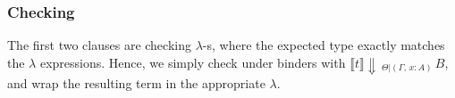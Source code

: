 \documentclass[acmsmall,review,anonymous,prologue,dvipsnames]{acmart}\settopmatter{printfolios=true,printccs=false,printacmref=false}
\newcommand{\To}{\Rightarrow}
\newcommand{\fail}{\mathsf{fail}}
\newcommand{\echeck}[4]{\llbracket#1\rrbracket\!\Downarrow\,_{#2|#3}\,#4}
\newcommand{\einfer}[4]{\llbracket#1\rrbracket\!\Uparrow\,#2\,_{#3|#4}}
\newcommand{\edo}{\boldsymbol{\mathsf{do}}}
\newcommand{\ereturn}{\boldsymbol{\mathsf{return}}}
\newcommand{\ecase}{\boldsymbol{\mathsf{case}}}
\newcommand{\eof}{\boldsymbol{\mathsf{of}}}
\newcommand{\true}{\mathsf{true}}
\newcommand{\false}{\mathsf{false}}
\newcommand{\einsert}[3]{\mathsf{insert}\,#1\,#2\,#3}
\theoremstyle{remark}
\begin{document}

\subsubsection{Checking}
The first two clauses are checking $\lambda$-s, where the expected type exactly
matches the $\lambda$ expressions. Hence, we simply check under binders with
$\echeck{t}{\Theta}{(\Gamma,\,x:A)} B$, and wrap the resulting term in the
appropriate $\lambda$.
\end{document}
